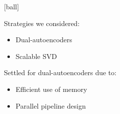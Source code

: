 
        [ball]

        Strategies we considered:
        \begin{itemize}
            \item Dual-autoencoders
            \item Scalable SVD
        \end{itemize}

        \vspace{2ex}

        Settled for dual-autoencoders due to:
        \begin{itemize}
            \item Efficient use of memory
            \item Parallel pipeline design
        \end{itemize}